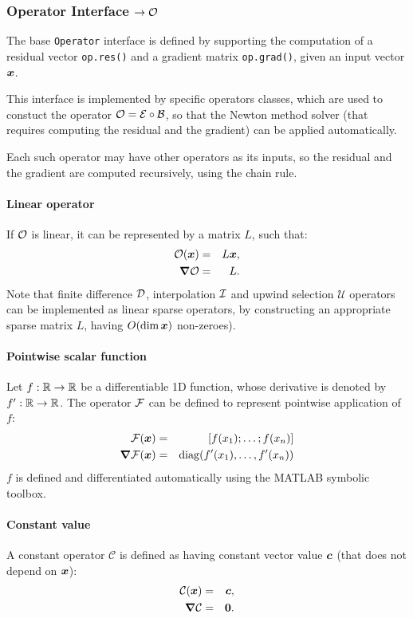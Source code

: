 \subsubsection{Operator Interface $ \rightarrow \mathcal{O}$}
The base \verb|Operator| interface is defined by 
supporting the computation of a residual vector \verb|op.res()|
and a gradient matrix \verb|op.grad()|, given an input vector $\boldsymbol{x}$.

This interface is implemented by specific operators classes,
which are used to constuct the operator $\mathcal{O} = \mathcal{E} \circ \mathcal{B}$, so that 
the Newton method solver (that requires computing the residual and the gradient) 
can be applied automatically.

Each such operator may have other operators as its inputs, so the residual
and the gradient are computed recursively, using the chain rule.

\paragraph{Linear operator}
If $\mathcal{O}$ is linear, it can be represented by a matrix $L$, such that:
\begin{eqnarray}
\mathcal{O}(\boldsymbol{x}) &=& L \boldsymbol{x}, \\
\boldsymbol{\nabla}\mathcal{O} &=& L. 
\end{eqnarray}
Note that finite difference $\mathcal{D}$, interpolation $\mathcal{I}$ and 
upwind selection $\mathcal{U}$ operators
can be implemented as linear sparse operators, by constructing 
an appropriate sparse matrix $L$, having $O(\dim \boldsymbol{x})$ non-zeroes).

\paragraph{Pointwise scalar function}
Let $f: \mathbb{R} \rightarrow \mathbb{R}$ be a differentiable 1D function, whose derivative is
denoted by $f': \mathbb{R} \rightarrow \mathbb{R}$. The operator $\mathcal{F}$ can be defined to
represent pointwise application of $f$:
\begin{eqnarray}
\mathcal{F}(\boldsymbol{x}) &=& [f(x_1); \ldots; f(x_n)] \\
\boldsymbol{\nabla}\mathcal{F}(\boldsymbol{x}) &=& \mathrm{diag}(f'(x_1), \ldots, f'(x_n))
\end{eqnarray}
$f$ is defined and differentiated automatically using the MATLAB symbolic toolbox.

\paragraph{Constant value}
A constant operator $\mathcal{C}$ is defined as having constant vector value $\boldsymbol{c}$ 
(that does not depend on $\boldsymbol{x}$):
\begin{eqnarray}
\mathcal{C}(\boldsymbol{x}) &=& \boldsymbol{c}, \\
\boldsymbol{\nabla}\mathcal{C} &=& \boldsymbol{0}.
\end{eqnarray}


